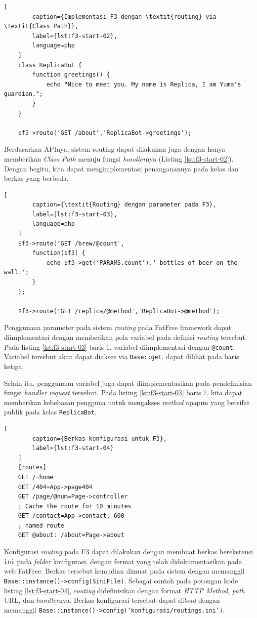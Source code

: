     \begin{lstlisting}[
        caption={Implementasi F3 dengan \textit{routing} via \textit{Class Path}},
        label={lst:f3-start-02},
        language=php
    ]
    class ReplicaBot {
        function greetings() {
            echo "Nice to meet you. My name is Replica, I am Yuma's guardian.";
        }
    }
    
    $f3->route('GET /about','ReplicaBot->greetings');
    \end{lstlisting}

    Berdasarkan APInya, sistem routing dapat dilakukan juga dengan hanya
    memberikan \textit{Class Path} menuju fungsi \textit{handler}nya (Listing
    \ref{lst:f3-start-02}). Dengan begitu, kita dapat mengimplementasi
    penanganannya pada kelas dan berkas yang berbeda.
    
    \begin{lstlisting}[
        caption={\textit{Routing} dengan parameter pada F3},
        label={lst:f3-start-03},
        language=php
    ]
    $f3->route('GET /brew/@count',
        function($f3) {
            echo $f3->get('PARAMS.count').' bottles of beer on the wall.';
        }
    );
    
    $f3->route('GET /replica/@method','ReplicaBot->@method');
    \end{lstlisting}
    Penggunaan parameter pada sistem \textit{routing} pada FatFree framework
    dapat diimplementasi dengan memberikan pola variabel pada definisi
    \textit{routing} tersebut. Pada listing \ref{lst:f3-start-03} baris 1,
    variabel diimplementasi dengan
    \texttt{@count}. Variabel tersebut akan dapat diakses via \texttt{Base::get},
    dapat dilihat pada baris ketiga.
    
    Selain itu, penggunaan variabel juga dapat diimplementasikan pada
    pendefinisian fungsi \textit{handler} \textit{request} tersebut. Pada
    listing \ref{lst:f3-start-03} baris 7, kita dapat memberikan kebebasan
    pengguna untuk mengakses \textit{method} apapun yang bersifat publik pada
    kelas \texttt{ReplicaBot}.
    \begin{lstlisting}[
        caption={Berkas konfigurasi untuk F3},
        label={lst:f3-start-04}
    ]
    [routes]
    GET /=home
    GET /404=App->page404
    GET /page/@num=Page->controller
    ; Cache the route for 10 minutes
    GET /contact=App->contact, 600
    ; named route
    GET @about: /about=Page->about
    \end{lstlisting}
    Konfigurasi \textit{routing} pada F3 dapat dilakukan dengan membuat berkas
    berekstensi \texttt{ini} pada \textit{folder} konfigurasi, dengan format yang telah 
    didokumentasikan pada web FatFree. Berkas tersebut kemudian dimuat pada sistem
    dengan memanggil \texttt{Base::instance()->config(\$iniFile)}.    
    Sebagai contoh pada potongan kode listing \ref{lst:f3-start-04},
    \textit{routing} didefinisikan dengan format \textit{HTTP Method}, \textit{path} URL,
    dan \textit{handler}nya. Berkas konfigurasi tersebut dapat di\textit{load}
    dengan memanggil \texttt{Base::instance()->config('konfigurasi/routings.ini')}.
     
